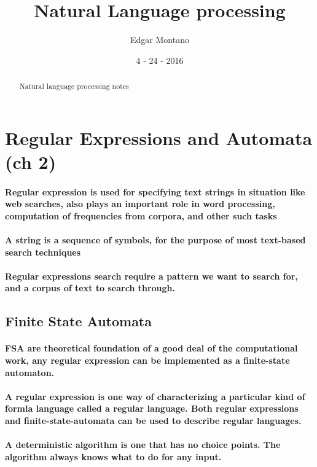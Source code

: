 \documentclass[a4paper]{article}
\title{Natural Language processing}
\author{Edgar Montano}
\date{4 - 24 - 2016}
\begin{document}
\maketitle

\begin{abstract}
Natural language processing notes
\end{abstract}

\section{Regular Expressions and Automata (ch 2)}
\paragraph{Regular expression is used for specifying text strings in situation like web searches, also plays an important role in word processing, computation of frequencies from corpora, and other such tasks}
\paragraph{A string is a sequence of symbols, for the purpose of most text-based search techniques}
\paragraph{Regular expressions search require a \textbf{pattern} we want to search for, and a \textbf{corpus} of text to search through.  }
\subsection{Finite State Automata}
\paragraph{FSA are theoretical foundation of a good deal of the computational work, any regular expression can be implemented as a finite-state automaton.}
\paragraph{A regular expression is one way of characterizing a particular kind of formla language called a \textbf{regular language.} Both regular expressions and finite-state-automata can be used to describe regular languages. }
\paragraph{A \textbf{deterministic} algorithm is one that has no choice points. The algorithm always knows what to do for any input.  }
\end{document}
